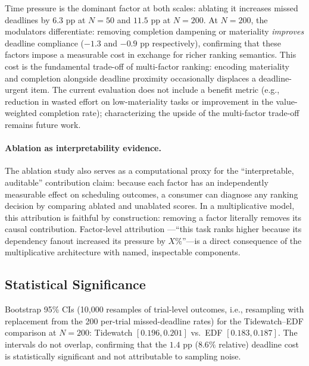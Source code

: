 \documentclass[11pt]{article}
\begin{document}
Time pressure is the dominant factor at both scales: ablating it
increases missed deadlines by $6.3$ pp at $N{=}50$ and $11.5$ pp
at $N{=}200$.  At $N{=}200$, the modulators differentiate:
removing completion dampening or materiality \emph{improves}
deadline compliance ($-1.3$ and $-0.9$ pp respectively), confirming
that these factors impose a measurable cost in exchange for richer
ranking semantics.  This cost is the fundamental trade-off of
multi-factor ranking: encoding materiality and completion
alongside deadline proximity occasionally displaces a
deadline-urgent item.  The current evaluation does not include a
benefit metric (e.g., reduction in wasted effort on low-materiality
tasks or improvement in the value-weighted completion rate);
characterizing the upside of the multi-factor trade-off remains
future work.

\paragraph{Ablation as interpretability evidence.}
The ablation study also serves as a computational proxy for the
``interpretable, auditable'' contribution claim: because each
factor has an independently measurable effect on scheduling
outcomes, a consumer can diagnose any ranking decision by
comparing ablated and unablated scores.  In a multiplicative model,
this attribution is faithful by construction: removing a factor
literally removes its causal contribution.  Factor-level attribution
---``this task ranks higher because its dependency fanout increased
its pressure by $X\%$''---is a direct consequence of the
multiplicative architecture with named, inspectable components.

\subsection{Statistical Significance}
\label{sec:significance}

Bootstrap 95\% CIs (10{,}000 resamples of trial-level outcomes,
i.e., resampling with replacement from the 200 per-trial
missed-deadline rates) for the Tidewatch--EDF comparison at
$N{=}200$: Tidewatch $[0.196, 0.201]$ vs.\ EDF $[0.183, 0.187]$.
The intervals do not overlap, confirming that the $1.4$ pp
($8.6\%$ relative) deadline cost is statistically significant
and not attributable to sampling noise.
\end{document}
